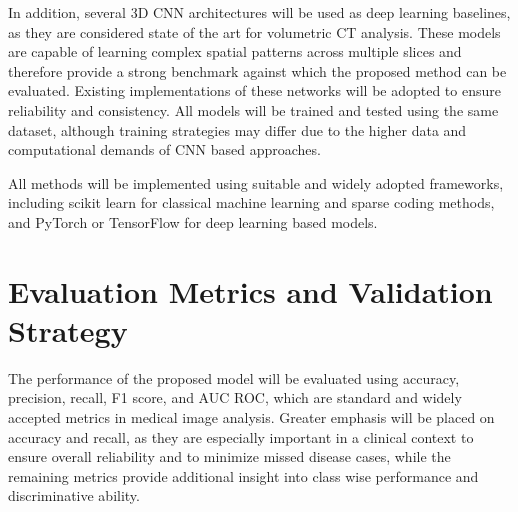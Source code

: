 In addition, several 3D CNN architectures will be used as deep learning baselines,
as they are considered state of the art for volumetric CT analysis\cite{Tiwari2023Comprehensive}. 
These models are capable of learning complex spatial patterns across multiple slices and therefore provide a strong benchmark against
which the proposed method can be evaluated. Existing implementations of these networks will be adopted to ensure reliability and consistency.
All models will be trained and tested using the same dataset, although training strategies may differ due to the higher data and computational
demands of CNN based approaches.

All methods will be implemented using suitable and widely adopted frameworks, including scikit learn for classical machine learning
and sparse coding methods, and PyTorch or TensorFlow for deep learning based models.

\section{Evaluation Metrics and Validation Strategy}
The performance of the proposed model will be evaluated using accuracy, precision, recall, F1 score, and AUC ROC, which are standard
and widely accepted metrics in medical image analysis. Greater emphasis will be placed on accuracy and recall, as they are especially
important in a clinical context to ensure overall reliability and to minimize missed disease cases, while the remaining metrics
provide additional insight into class wise performance and discriminative ability.